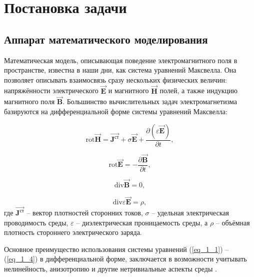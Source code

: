 \chapter{Постановка задачи}

\section{Аппарат математического моделирования}

Математическая модель, описывающая поведение электромагнитного поля в пространстве, известна в наши дни, как система уравнений Максвелла. Она позволяет описывать взаимосвязь сразу нескольких физических величин: напряжённости электрического $\overrightarrow{\textbf{E}}$ и магнитного $\overrightarrow{\textbf{H}}$ полей, а также индукцию магнитного поля $\overrightarrow{\textbf{B}}$. Большинство вычислительных задач электромагнетизма базируются на дифференциальной форме системы уравнений Максвелла:

\begin{equation} \label{eq_1_1}
	\text{rot} \overrightarrow{\textbf{H}} = \overrightarrow{\textbf{J}^{\text{ст}}} + \sigma \overrightarrow{\textbf{E}} + \frac{\partial \left(\varepsilon \overrightarrow{\textbf{E}} \right)}{\partial t},
\end{equation}

\begin{equation} \label{eq_1_2}
	\text{rot} \overrightarrow{\textbf{E}} = - \frac{\partial \overrightarrow{\textbf{B}}}{\partial t},
\end{equation}

\begin{equation} \label{eq_1_3}
	\text{div} \overrightarrow{\textbf{B}} = 0,
\end{equation}

\begin{equation} \label{eq_1_4}
	\text{div} \varepsilon \overrightarrow{\textbf{E}} = \rho,
\end{equation}
где $\overrightarrow{\textbf{J}^{\text{ст}}}$ -- вектор плотностей сторонних токов, $\sigma$ -- удельная электрическая проводимость среды, $\varepsilon$ -- диэлектрическая проницаемость среды, а $\rho$ -- объёмная плотность стороннего электрического заряда.

Основное преимущество использования системы уравнений (\ref{eq_1_1}) -- (\ref{eq_1_4}) в дифференциальной форме, заключается в возможности учитывать нелинейность, анизотропию и другие нетривиальные аспекты среды \cite{3}. 


